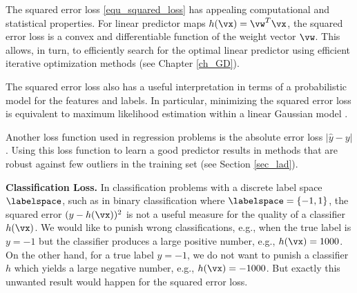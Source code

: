 \documentclass[12pt]{report}
\begin{document}
The squared error loss \eqref{equ_squared_loss} has appealing 
computational and statistical properties. For linear predictor 
maps $h(\vx) = \vw^{T} \vx$, the squared error loss is a 
convex and differentiable function of the weight vector $\vw$. 
This allows, in turn, to efficiently search for the optimal linear 
predictor using efficient iterative optimization methods (see Chapter \ref{ch_GD}). 

The squared error loss also has a useful interpretation in terms of a probabilistic 
model for the features and labels. In particular, minimizing the squared error loss 
is equivalent to maximum likelihood estimation within a linear Gaussian model \cite[Sec. 2.6.3]{hastie01statisticallearning}. 

Another loss function used in regression problems is the absolute error loss $|\hat{y} - y|$. 
Using this loss function to learn a good predictor results in methods that are robust 
against few outliers in the training set (see Section \ref{sec_lad}).  

{\bf Classification Loss.} In classification problems with a discrete label space $\labelspace$, 
such as in binary classification where $\labelspace = \{-1,1\}$, the squared error $(y - h(\vx))^2$ 
is not a useful measure for the quality of a classifier $h(\vx)$. We would like to punish wrong 
classifications, e.g., when the true label is $y=-1$ but the classifier produces a large positive 
number, e.g., $h(\vx) = 1000$. On the other hand, for a true label $y=-1$, we do not want to 
punish a classifier $h$ which yields a large negative number, e.g., $h(\vx) = -1000$. But exactly 
this unwanted result would happen for the squared error loss. 
\end{document}

